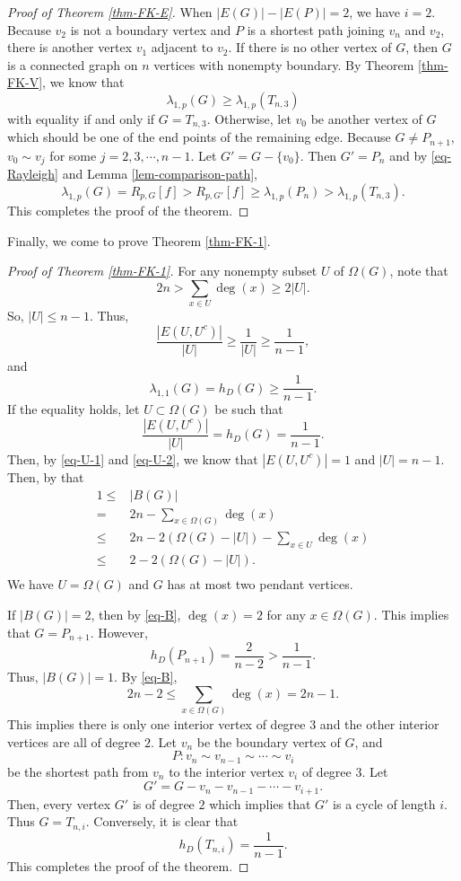 \documentclass[12pt]{amsart}
\theoremstyle{definition}
\theoremstyle{remark}
\numberwithin{equation}{section}
\begin{document}
\begin{proof}[Proof of Theorem \ref{thm-FK-E}]
When $|E(G)|-|E(P)|=2$, we have $i=2$. Because $v_2$ is not a boundary vertex and $P$ is a shortest path joining $v_n$ and $v_2$, there is another vertex $v_1$ adjacent to $v_2$. If there is no other vertex of $G$, then $G$ is a connected graph on $n$ vertices with nonempty boundary. By Theorem \ref{thm-FK-V}, we know that
$$\lambda_{1,p}(G)\geq \lambda_{1,p}(T_{n,3})$$
with equality if and only if $G=T_{n,3}$. Otherwise, let $v_0$ be another vertex of $G$ which should be one of the end points of the remaining edge. Because $G\neq P_{n+1}$, $v_0\sim v_j$ for some $j=2,3,\cdots,n-1$. Let $G'=G-\{v_0\}$. Then $G'=P_n$ and
by \eqref{eq-Rayleigh} and Lemma \ref{lem-comparison-path},
$$\lambda_{1,p}(G)=R_{p,G}[f]>R_{p,G'}[f]\geq \lambda_{1,p}(P_n)>\lambda_{1,p}({T_{n,3}}).$$
This completes the proof of the theorem.
\end{proof}
Finally, we come to prove Theorem \ref{thm-FK-1}.
\begin{proof}[Proof of Theorem \ref{thm-FK-1}]
For any nonempty subset $U$ of $\Omega(G)$, note that
\begin{equation}\label{eq-U-1}
2n>\sum_{x\in U}\deg(x)\geq 2|U|.
\end{equation}
So, $|U|\leq n-1$. Thus, 
\begin{equation}\label{eq-U-2}
\frac{|E(U,U^c)|}{|U|}\geq \frac{1}{|U|}\geq \frac{1}{n-1},
\end{equation}
and
$$\lambda_{1,1}(G)=h_{D}(G)\geq\frac{1}{n-1}.$$
If the equality holds,  let $U\subset \Omega(G)$ be such that 
$$\frac{|E(U,U^c)|}{|U|}=h_D(G)=\frac{1}{n-1}.$$
Then, by \eqref{eq-U-1} and \eqref{eq-U-2}, we know that $|E(U,U^c)|=1$ and $|U|=n-1$. Then, by that 
\begin{equation}\label{eq-B}
\begin{split}
1\leq&|B(G)|\\
=&2n-\sum_{x\in \Omega(G)}\deg(x)\\
\leq&2n-2(\Omega(G)-|U|)-\sum_{x\in U}\deg(x)\\
\leq& 2-2(\Omega(G)-|U|).\\
\end{split}
\end{equation}
We have $U=\Omega(G)$ and $G$ has at most two pendant vertices. 

If $|B(G)|=2$, then by \eqref{eq-B}, $\deg(x)=2$ for any $x\in\Omega(G)$. This implies that $G=P_{n+1}$. However, 
$$h_D(P_{n+1})=\frac{2}{n-2}>\frac{1}{n-1}.$$
Thus, $|B(G)|=1$. By \eqref{eq-B},  
$$2n-2\leq \sum_{x\in \Omega(G)}\deg(x)=2n-1.$$
This implies there is only one interior vertex of degree $3$ and the other interior vertices are all of degree $2$. Let $v_n$ be the boundary vertex of $G$, and 
$$P:v_n\sim v_{n-1}\sim \cdots\sim v_i$$ 
be the shortest path from $v_n$ to the interior vertex $v_i$ of degree $3$. Let 
$$G'=G-v_n-v_{n-1}-\cdots-v_{i+1}.$$
Then, every vertex $G'$ is of degree $2$ which implies that $G'$ is a cycle of length $i$. Thus $G=T_{n,i}$. Conversely, it is clear that 
$$h_D(T_{n,i})=\frac{1}{n-1}.$$
This completes the proof of the theorem.
\end{proof}
\end{document}

